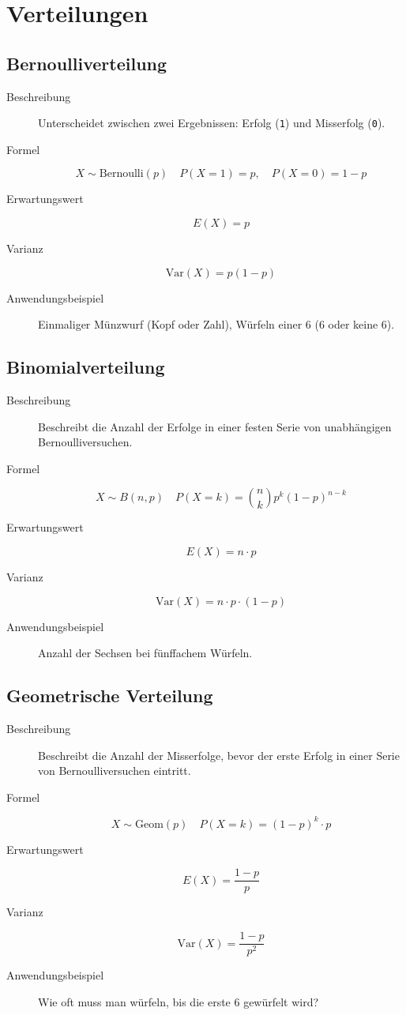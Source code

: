 \chapter{Verteilungen}

\section{Bernoulliverteilung}
\begin{description}
    \item[Beschreibung] Unterscheidet zwischen zwei Ergebnissen: Erfolg (\texttt{1}) und Misserfolg (\texttt{0}).
    \item[Formel] \[ X \sim \text{Bernoulli}(p) \quad P(X=1) = p, \quad P(X=0) = 1-p \]
    \item[Erwartungswert] \[ E(X) = p \]
    \item[Varianz] \[ \text{Var}(X) = p(1-p) \]
    \item[Anwendungsbeispiel] Einmaliger Münzwurf (Kopf oder Zahl), Würfeln einer 6 (6 oder keine 6).
\end{description}

\section{Binomialverteilung}
\begin{description}
    \item[Beschreibung] Beschreibt die Anzahl der Erfolge in einer festen Serie von unabhängigen Bernoulliversuchen.
    \item[Formel] \[ X \sim B(n, p) \quad P(X=k) = \binom{n}{k} p^k {(1-p)}^{n-k} \]
    \item[Erwartungswert] \[ E(X) = n \cdot p \]
    \item[Varianz] \[ \text{Var}(X) = n \cdot p \cdot (1-p) \]
    \item[Anwendungsbeispiel] Anzahl der Sechsen bei fünffachem Würfeln.
\end{description}

\section{Geometrische Verteilung}
\begin{description}
    \item[Beschreibung] Beschreibt die Anzahl der Misserfolge, bevor der erste Erfolg in einer Serie von Bernoulliversuchen eintritt.
    \item[Formel] \[ X \sim \text{Geom}(p) \quad P(X=k) = {(1-p)}^k \cdot p \]
    \item[Erwartungswert] \[ E(X) = \frac{1-p}{p} \]
    \item[Varianz] \[ \text{Var}(X) = \frac{1-p}{p^2} \]
    \item[Anwendungsbeispiel] Wie oft muss man würfeln, bis die erste 6 gewürfelt wird?
\end{description}

